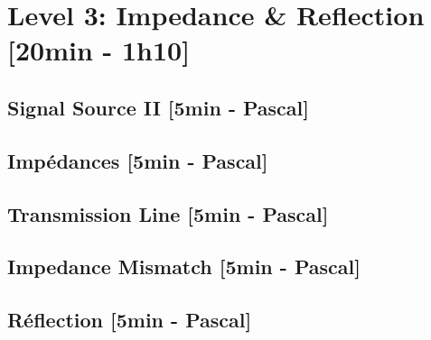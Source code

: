 
\section{Level 3: Impedance \& Reflection [20min - 1h10]}
\subsection{Signal Source II [5min - Pascal]}

\subsection{Impédances [5min - Pascal]}
\subsection{Transmission Line [5min - Pascal]}

\subsection{Impedance Mismatch [5min - Pascal]}


\subsection{Réflection [5min - Pascal]}
